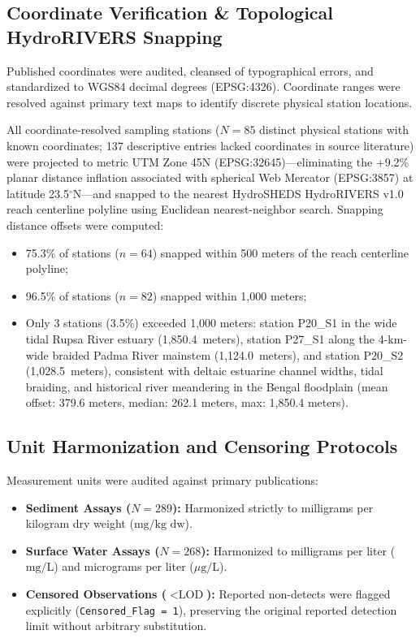 \documentclass[11pt,a4paper]{article}
\begin{document}
\subsection*{Coordinate Verification \& Topological HydroRIVERS Snapping}
Published coordinates were audited, cleansed of typographical errors, and standardized to WGS84 decimal degrees (EPSG:4326). Coordinate ranges were resolved against primary text maps to identify discrete physical station locations.

All coordinate-resolved sampling stations ($N=85$ distinct physical stations with known coordinates; 137 descriptive entries lacked coordinates in source literature) were projected to metric UTM Zone 45N (EPSG:32645)---eliminating the +9.2\% planar distance inflation associated with spherical Web Mercator (EPSG:3857) at latitude 23.5$^\circ$N---and snapped to the nearest HydroSHEDS HydroRIVERS v1.0 reach centerline polyline \citep{Lehner2013} using Euclidean nearest-neighbor search. Snapping distance offsets were computed:
\begin{itemize}
    \item 75.3\% of stations ($n=64$) snapped within 500 meters of the reach centerline polyline;
    \item 96.5\% of stations ($n=82$) snapped within 1,000 meters;
    \item Only 3 stations (3.5\%) exceeded 1,000 meters: station P20\_S1 in the wide tidal Rupsa River estuary (1,850.4~meters), station P27\_S1 along the 4-km-wide braided Padma River mainstem (1,124.0~meters), and station P20\_S2 (1,028.5~meters), consistent with deltaic estuarine channel widths, tidal braiding, and historical river meandering in the Bengal floodplain \citep{Goodbred1999} (mean offset: 379.6 meters, median: 262.1 meters, max: 1,850.4 meters).
\end{itemize}

\subsection*{Unit Harmonization and Censoring Protocols}
Measurement units were audited against primary publications:
\begin{itemize}
    \item \textbf{Sediment Assays ($N=289$):} Harmonized strictly to milligrams per kilogram dry weight ($\text{mg/kg dw}$).
    \item \textbf{Surface Water Assays ($N=268$):} Harmonized to milligrams per liter ($\text{mg/L}$) and micrograms per liter ($\mu\text{g/L}$).
    \item \textbf{Censored Observations ($<\text{LOD}$):} Reported non-detects were flagged explicitly (\texttt{Censored\_Flag = 1}), preserving the original reported detection limit without arbitrary substitution.
\end{itemize}
\end{document}
